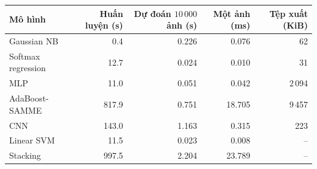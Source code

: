 \begin{tabular}{lrrrr}
\toprule
Mô hình & Huấn luyện (s) & Dự đoán $10\,000$ ảnh (s) & Một ảnh (ms) & Tệp xuất (KiB) \\
\midrule
Gaussian NB & 0.4 & 0.226 & 0.076 & 62 \\
Softmax regression & 12.7 & 0.024 & 0.010 & 31 \\
MLP & 11.0 & 0.051 & 0.042 & 2\,094 \\
AdaBoost-SAMME & 817.9 & 0.751 & 18.705 & 9\,457 \\
CNN & 143.0 & 1.163 & 0.315 & 223 \\
\midrule
Linear SVM & 11.5 & 0.023 & 0.008 & -- \\
Stacking & 997.5 & 2.204 & 23.789 & -- \\
\bottomrule
\end{tabular}
